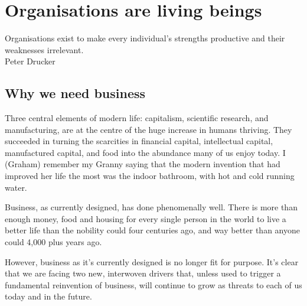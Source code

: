 \chapter{Organisations are living beings}
\label{chapter:who-is-your-organisation-base}


\begin{chapterquotation}
Organisations exist to make every individual's strengths productive and their weaknesses irrelevant.\\
\raggedleft\textemdash Peter Drucker
\end{chapterquotation}






\section{Why we need business}
Three central elements of modern life: capitalism, scientific research, and manufacturing, are at the centre of the huge increase in humans thriving. They succeeded in turning the scarcities in financial capital, intellectual capital, manufactured capital, and food into the abundance many of us enjoy today. I (Graham) remember my Granny saying that the modern invention that had improved her life the most was the indoor bathroom, with hot and cold running water.


Business, as currently designed, has done phenomenally well. There is more than enough money, food and housing for every single person in the world to live a better life than the nobility could four centuries ago, and way better than anyone could 4,000 plus years ago. 


However, business as it’s currently designed is no longer fit for purpose. It’s clear that we are  facing two new, interwoven drivers that, unless used to trigger a fundamental reinvention of business, will continue to grow as threats to each of us today and in the future. 


